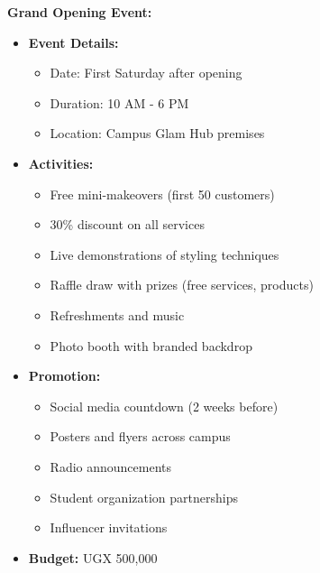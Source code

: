 \documentclass[a4paper,12pt]{article}
\begin{document}
\textbf{Grand Opening Event:}
\begin{itemize}[leftmargin=2em]
    \item \textbf{Event Details:}
    \begin{itemize}
        \item Date: First Saturday after opening
        \item Duration: 10 AM - 6 PM
        \item Location: Campus Glam Hub premises
    \end{itemize}
    
    \item \textbf{Activities:}
    \begin{itemize}
        \item Free mini-makeovers (first 50 customers)
        \item 30\% discount on all services
        \item Live demonstrations of styling techniques
        \item Raffle draw with prizes (free services, products)
        \item Refreshments and music
        \item Photo booth with branded backdrop
    \end{itemize}
    
    \item \textbf{Promotion:}
    \begin{itemize}
        \item Social media countdown (2 weeks before)
        \item Posters and flyers across campus
        \item Radio announcements
        \item Student organization partnerships
        \item Influencer invitations
    \end{itemize}
    
    \item \textbf{Budget:} UGX 500,000
\end{itemize}
\end{document}
